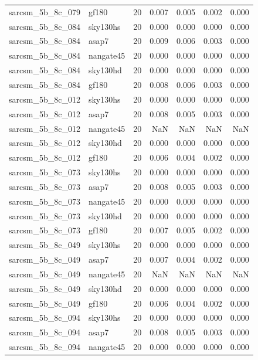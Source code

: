 \begin{tabular}{llrrrrr}
sarcsm\_5b\_8c\_079 & gf180 & 20 & 0.007 & 0.005 & 0.002 & 0.000 \\
sarcsm\_5b\_8c\_084 & sky130hs & 20 & 0.000 & 0.000 & 0.000 & 0.000 \\
sarcsm\_5b\_8c\_084 & asap7 & 20 & 0.009 & 0.006 & 0.003 & 0.000 \\
sarcsm\_5b\_8c\_084 & nangate45 & 20 & 0.000 & 0.000 & 0.000 & 0.000 \\
sarcsm\_5b\_8c\_084 & sky130hd & 20 & 0.000 & 0.000 & 0.000 & 0.000 \\
sarcsm\_5b\_8c\_084 & gf180 & 20 & 0.008 & 0.006 & 0.003 & 0.000 \\
sarcsm\_5b\_8c\_012 & sky130hs & 20 & 0.000 & 0.000 & 0.000 & 0.000 \\
sarcsm\_5b\_8c\_012 & asap7 & 20 & 0.008 & 0.005 & 0.003 & 0.000 \\
sarcsm\_5b\_8c\_012 & nangate45 & 20 & NaN & NaN & NaN & NaN \\
sarcsm\_5b\_8c\_012 & sky130hd & 20 & 0.000 & 0.000 & 0.000 & 0.000 \\
sarcsm\_5b\_8c\_012 & gf180 & 20 & 0.006 & 0.004 & 0.002 & 0.000 \\
sarcsm\_5b\_8c\_073 & sky130hs & 20 & 0.000 & 0.000 & 0.000 & 0.000 \\
sarcsm\_5b\_8c\_073 & asap7 & 20 & 0.008 & 0.005 & 0.003 & 0.000 \\
sarcsm\_5b\_8c\_073 & nangate45 & 20 & 0.000 & 0.000 & 0.000 & 0.000 \\
sarcsm\_5b\_8c\_073 & sky130hd & 20 & 0.000 & 0.000 & 0.000 & 0.000 \\
sarcsm\_5b\_8c\_073 & gf180 & 20 & 0.007 & 0.005 & 0.002 & 0.000 \\
sarcsm\_5b\_8c\_049 & sky130hs & 20 & 0.000 & 0.000 & 0.000 & 0.000 \\
sarcsm\_5b\_8c\_049 & asap7 & 20 & 0.007 & 0.004 & 0.002 & 0.000 \\
sarcsm\_5b\_8c\_049 & nangate45 & 20 & NaN & NaN & NaN & NaN \\
sarcsm\_5b\_8c\_049 & sky130hd & 20 & 0.000 & 0.000 & 0.000 & 0.000 \\
sarcsm\_5b\_8c\_049 & gf180 & 20 & 0.006 & 0.004 & 0.002 & 0.000 \\
sarcsm\_5b\_8c\_094 & sky130hs & 20 & 0.000 & 0.000 & 0.000 & 0.000 \\
sarcsm\_5b\_8c\_094 & asap7 & 20 & 0.008 & 0.005 & 0.003 & 0.000 \\
sarcsm\_5b\_8c\_094 & nangate45 & 20 & 0.000 & 0.000 & 0.000 & 0.000 \\

\end{tabular}
